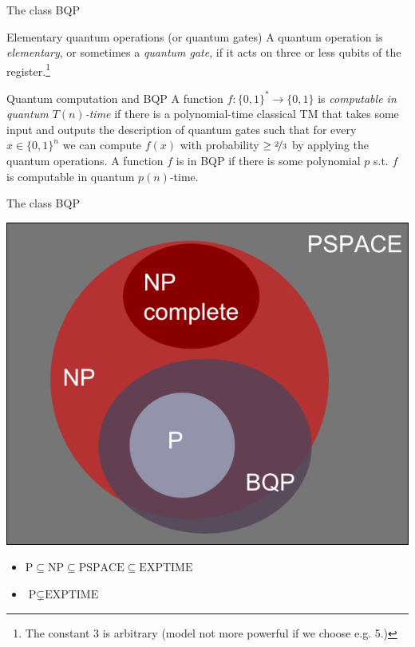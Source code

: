 \documentclass[c]{beamer}
\begin{document}
\begin{frame}{The class BQP}
	\begin{block}{Elementary quantum operations (or quantum gates)}
		A quantum operation is \emph{elementary}, or sometimes a \emph{quantum gate}, if it acts on three or less qubits of the register.\footnote{The constant 3 is arbitrary (model not more powerful if we choose e.g. 5.)}
	\end{block}
	
	\begin{block}{Quantum computation and BQP}
		A function $f:\{0,1\}^{*} \rightarrow \{0,1\}$ is \emph{computable in quantum $T(n)$-time} if there is a polynomial-time classical TM that takes some input and outputs the description of quantum gates such that for every $x \in \{0,1\}^{n}$ we can compute $f(x)$ with probability $\ge \nicefrac{2}{3}$ by applying the quantum operations. A function $f$ is in BQP if there is some polynomial $p$ s.t. $f$ is computable in quantum $p(n)$-time.
	\end{block}
\end{frame}


\begin{frame}{The class BQP}

\begin{center}
\includegraphics[scale=0.20]{images/classes.png} 	
\end{center}

\begin{itemize}
\item $\mbox{P} \subseteq \mbox{NP}  \subseteq \mbox{PSPACE} \subseteq \mbox{EXPTIME} $

\item $\mbox{P} \subsetneq \mbox{EXPTIME}$
	\end{itemize}
	
\end{frame}
\end{document}
